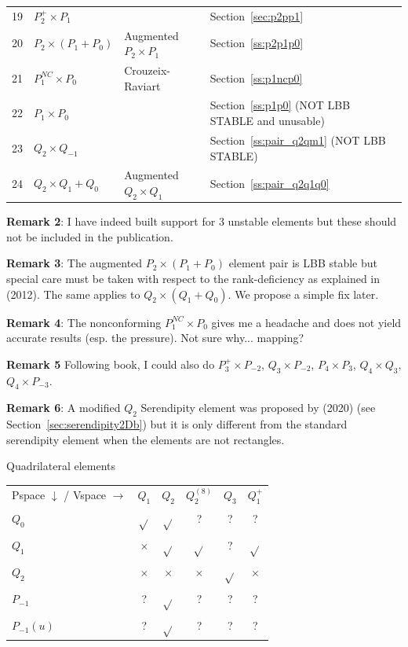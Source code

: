 \begin{center}
\begin{tabular}{p{1cm}p{2cm}p{4cm}p{8cm}}
19&$P_2^+\times P_{1}$   &                  & Section~\ref{sec:p2pp1}\\
20&$P_2\times (P_1+P_0)$ & Augmented $P_2\times P_1$ & Section~\ref{ss:p2p1p0}\\
21&$P_1^{NC}\times P_0$  & Crouzeix-Raviart & Section~\ref{ss:p1ncp0}\\
22&$P_1\times P_0$       &                  & Section~\ref{ss:p1p0}  (NOT LBB STABLE and unusable)\\
23&$Q_2\times Q_{-1}$    &                  & Section~\ref{ss:pair_q2qm1} (NOT LBB STABLE)\\
24&$Q_2\times Q_1+Q_0$   & Augmented $Q_2\times Q_1$ & Section~\ref{ss:pair_q2q1q0} \\
\hline
\end{tabular}
\end{center}


{\bf Remark 2}: I have indeed built support for 3 unstable elements but 
these should not be included in the publication. 

{\bf Remark 3}: The augmented $P_2\times (P_1+P_0)$ element pair is LBB stable 
but special care must be taken with respect to the rank-deficiency 
as explained in \textcite{bocg12} (2012). The same applies to $Q_2\times (Q_1+Q_0)$. 
We propose a simple fix later. 

{\bf Remark 4}: The nonconforming $P_1^{NC}\times P_0$ gives me a headache and does not 
yield accurate results (esp. the pressure). Not sure why... mapping?

{\bf Remark 5} Following \textcite{john16} book, I could also do 
$P_3^+\times P_{-2}$, $Q_3\times P_{-2}$, $P_4\times P_3$, $Q_4\times Q_3$, $Q_4 \times P_{-3}$.

{\bf Remark 6}: A modified $Q_2$ Serendipity element was proposed by \textcite{zhxi20} (2020) 
(see Section~\ref{sec:serendipity2Db}) but it is only different from the standard serendipity 
element when the elements are not rectangles. 


\vspace{1cm}

\begin{center}
Quadrilateral elements\\
\begin{tabular}{lccccc}
\hline
Pspace $\downarrow$ / Vspace $\rightarrow$   
            & $Q_1$     & $Q_2$     & $Q_2^{(8)}$ & $Q_3$  & $Q_1^+$       \\ 
$Q_0$       & $\sqrt{}$ & $\sqrt{}$ & ?           & ?         & ?          \\
$Q_1$       & $\times$  & $\sqrt{}$ & $\sqrt{}$   & ?         & $\sqrt{}$  \\
$Q_2$       & $\times$  & $\times$  & $\times$    & $\sqrt{}$ & $\times$   \\
$P_{-1}$    & ?         & $\sqrt{}$ & ?           & ?         & ?          \\
$P_{-1}(u)$ & ?         & $\sqrt{}$ & ?           & ?         & ?          \\
\hline
\end{tabular}
\end{center}




